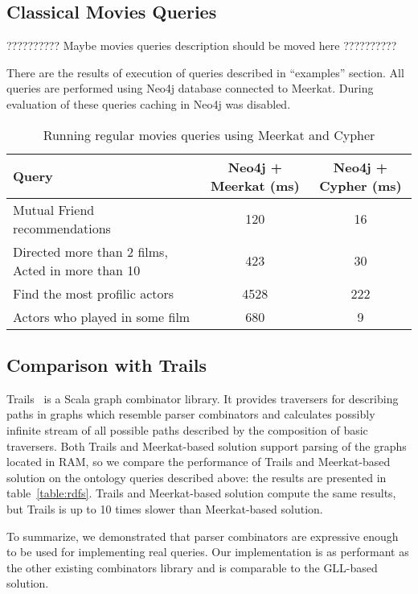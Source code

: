 \subsection{Classical Movies Queries}
?????????? Maybe movies queries description should be moved here ??????????

There are the results of execution of queries described in ``examples'' section.
All queries are performed using Neo4j database connected to Meerkat.
During evaluation of these queries caching in Neo4j was disabled.

\begin{table*}[t]
\centering
\begin{tabular}{|l|c|c|}
\hline
{Query} &
{Neo4j + Meerkat (ms)} &
{Neo4j + Cypher (ms)} \\
\hline
\hline
Mutual Friend recommendations & 120 & 16 \\
Directed more than 2 films, Acted in more than 10 & 423 & 30 \\
Find the most profilic actors & 4528 & 222 \\
Actors who played in some film & 680 & 9 \\
\hline
\end{tabular}
\caption{Running regular movies queries using Meerkat and Cypher}
\label{table:movies}
\end{table*}

\subsection{Comparison with Trails}

Trails~\cite{ScalaGraphParsing} is a Scala graph combinator library.
It provides traversers for describing paths in graphs which resemble parser combinators and calculates possibly infinite stream of all possible paths described by the composition of basic traversers.
Both Trails and Meerkat-based solution support parsing of the graphs located in RAM, so we compare the performance of Trails and Meerkat-based solution on the ontology queries described above: the results are presented in table~\ref{table:rdfs}.
Trails and Meerkat-based solution compute the same results, but Trails is up to 10 times slower than Meerkat-based solution.

To summarize, we demonstrated that parser combinators are expressive enough to be used for implementing real queries. 
Our implementation is as performant as the other existing combinators library and is comparable to the GLL-based solution.
